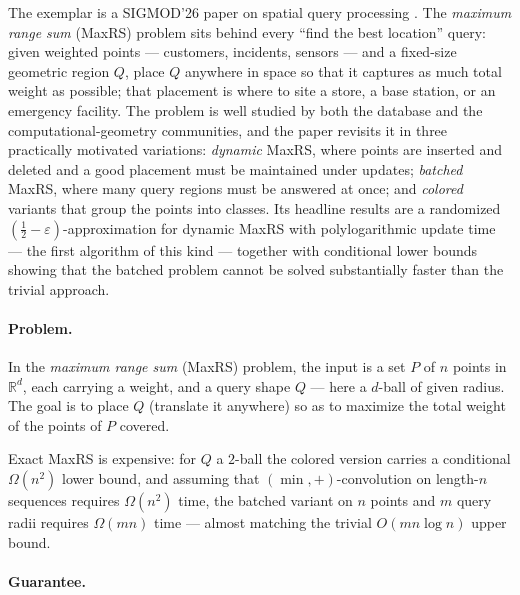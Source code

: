 The exemplar is a SIGMOD'26 paper on spatial query processing \cite{sigmod26-259}. The
\emph{maximum range sum} (MaxRS) problem sits behind every ``find the best location''
query: given weighted points --- customers, incidents, sensors --- and a fixed-size
geometric region $Q$, place $Q$ anywhere in space so that it captures as much total
weight as possible; that placement is where to site a store, a base station, or an
emergency facility. The problem is well studied by both the database and the
computational-geometry communities, and the paper revisits it in three practically
motivated variations: \emph{dynamic} MaxRS, where points are inserted and deleted and a
good placement must be maintained under updates; \emph{batched} MaxRS, where many query
regions must be answered at once; and \emph{colored} variants that group the points into
classes. Its headline results are a randomized $(\tfrac12-\varepsilon)$-approximation
for dynamic MaxRS with polylogarithmic update time --- the first algorithm of this kind
--- together with conditional lower bounds showing that the batched problem cannot be
solved substantially faster than the trivial approach.

\paragraph{Problem.}
In the \emph{maximum range sum} (MaxRS) problem, the input is a set $P$ of $n$ points in
$\mathbb{R}^d$, each carrying a weight, and a query shape $Q$ --- here a $d$-ball of
given radius. The goal is to place $Q$ (translate it anywhere) so as to maximize the
total weight of the points of $P$ covered.

Exact MaxRS is expensive: for $Q$ a $2$-ball the colored version carries a conditional
$\Omega(n^2)$ lower bound, and assuming that $(\min,+)$-convolution on length-$n$
sequences requires $\Omega(n^2)$ time, the batched variant on $n$ points and $m$ query
radii requires $\Omega(mn)$ time --- almost matching the trivial $O(mn\log n)$ upper
bound.


\paragraph{Guarantee.}

